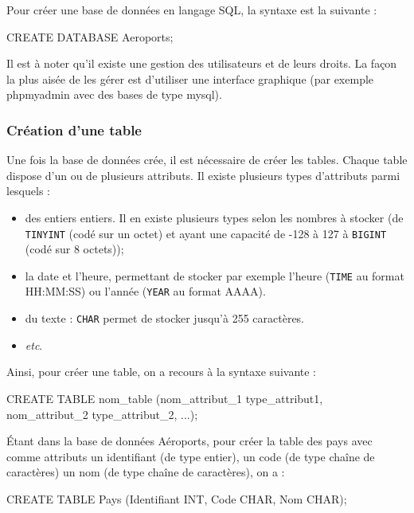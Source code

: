 \documentclass[10pt]{article}
\begin{document}
\begin{envsql}
Pour créer une base de données en langage SQL, la syntaxe est la suivante :

\begin{sql}
CREATE DATABASE Aeroports;
\end{sql}
\end{envsql}

Il est à noter qu'il existe une gestion des utilisateurs et de leurs droits. La façon la plus aisée de les gérer est d'utiliser une interface graphique (par exemple phpmyadmin avec des bases de type mysql).

\subsubsection{Création d'une table}
Une fois la base de données crée, il est nécessaire de créer les tables. Chaque table dispose d'un ou de plusieurs attributs. Il existe plusieurs types d'attributs parmi lesquels : 
\begin{itemize}
 \item des entiers entiers. Il en existe plusieurs types selon les nombres à stocker (de \texttt{TINYINT} (codé sur un octet) et ayant une capacité de -128 à 127 à \texttt{BIGINT} (codé sur 8 octets));
 \item la date et l'heure, permettant de stocker par exemple l'heure (\texttt{TIME} au format HH:MM:SS) ou l'année (\texttt{YEAR} au format AAAA).
 \item du texte : \texttt{CHAR} permet de stocker jusqu'à 255 caractères.
 \item \textit{etc}.
\end{itemize}

\begin{envsql}

Ainsi, pour créer une table, on a recours à la syntaxe suivante :
\begin{sql}
CREATE TABLE nom_table (nom_attribut_1 type_attribut1, nom_attribut_2  type_attribut_2, ...);
\end{sql}
\end{envsql}

\begin{exemple}
Étant dans la base de données Aéroports, pour créer la table des pays avec comme attributs un identifiant (de type entier), un code (de type chaîne de caractères) un nom (de type chaîne de caractères), on a :
\begin{envsql}
\begin{sql}
CREATE TABLE Pays (Identifiant INT, Code CHAR, Nom CHAR);
\end{sql}
\end{envsql}

\end{exemple}
\end{document}

